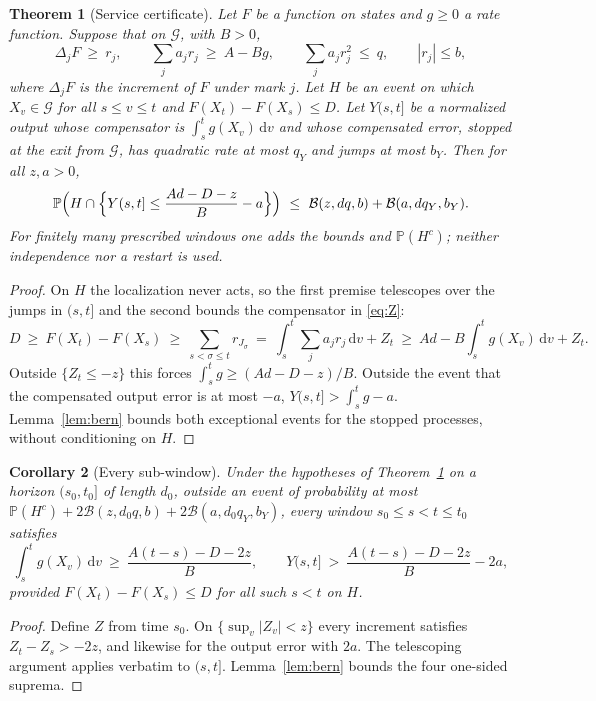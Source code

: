 \documentclass[11pt,letterpaper]{article}
\theoremstyle{plain}
\newtheorem{theorem}{Theorem}[section]
\newtheorem{corollary}[theorem]{Corollary}
\theoremstyle{definition}
\theoremstyle{remark}
\numberwithin{equation}{section}
\newcommand{\PP}{\mathbb P}
\newcommand{\cB}{\mathcal B}
\newcommand{\dd}{\,\mathrm d}
\begin{document}
\begin{theorem}[Service certificate]\label{thm:service}
Let $F$ be a function on states and $g\ge0$ a rate function. Suppose that on $\mathcal G$, with $B>0$,
\begin{equation}\label{eq:servicepremises}
 \Delta_jF\ \ge\ r_j,\qquad \sum_ja_jr_j\ \ge\ A-Bg,\qquad \sum_ja_jr_j^2\ \le\ q,\qquad |r_j|\le b ,
\end{equation}
where $\Delta_jF$ is the increment of $F$ under mark $j$. Let $H$ be an event on which $X_v\in\mathcal G$ for all $s\le v\le t$ and $F(X_t)-F(X_s)\le D$. Let $Y(s,t]$ be a normalized output whose compensator is $\int_s^tg(X_v)\dd v$ and whose compensated error, stopped at the exit from $\mathcal G$, has quadratic rate at most $q_Y$ and jumps at most $b_Y$. Then for all $z,a>0$,
\begin{equation}\label{eq:service}
 \PP\Bigl(H\cap\Bigl\{Y(s,t]\le\frac{Ad-D-z}{B}-a\Bigr\}\Bigr)\ \le\ \cB(z,dq,b)+\cB(a,dq_Y,b_Y).
\end{equation}
For finitely many prescribed windows one adds the bounds and $\PP(H^c)$; neither independence nor a restart is used.
\end{theorem}
\begin{proof}
On $H$ the localization never acts, so the first premise telescopes over the jumps in $(s,t]$ and the second bounds the compensator in \eqref{eq:Z}:
\[
 D\ \ge\ F(X_t)-F(X_s)\ \ge\ \sum_{s<\sigma\le t}r_{J_\sigma}\ =\ \int_s^t\sum_ja_jr_j\dd v+Z_t\ \ge\ Ad-B\int_s^tg(X_v)\dd v+Z_t .
\]
Outside $\{Z_t\le-z\}$ this forces $\int_s^tg\ge(Ad-D-z)/B$. Outside the event that the compensated output error is at most $-a$, $Y(s,t]>\int_s^tg-a$. Lemma~\ref{lem:bern} bounds both exceptional events for the stopped processes, without conditioning on $H$.
\end{proof}

\begin{corollary}[Every sub-window]\label{cor:allwindow}
Under the hypotheses of Theorem~\ref{thm:service} on a horizon $(s_0,t_0]$ of length $d_0$, outside an event of probability at most $\PP(H^c)+2\cB(z,d_0q,b)+2\cB(a,d_0q_Y,b_Y)$, every window $s_0\le s<t\le t_0$ satisfies
\[
 \int_s^tg(X_v)\dd v\ \ge\ \frac{A(t-s)-D-2z}{B},\qquad Y(s,t]\ >\ \frac{A(t-s)-D-2z}{B}-2a ,
\]
provided $F(X_t)-F(X_s)\le D$ for all such $s<t$ on $H$.
\end{corollary}
\begin{proof}
Define $Z$ from time $s_0$. On $\{\sup_v|Z_v|<z\}$ every increment satisfies $Z_t-Z_s>-2z$, and likewise for the output error with $2a$. The telescoping argument applies verbatim to $(s,t]$. Lemma~\ref{lem:bern} bounds the four one-sided suprema.
\end{proof}
\end{document}
